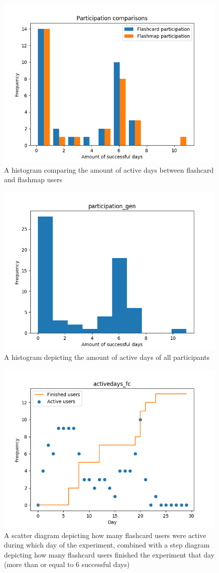 \begin{figure}[htbp]
    \centering
    \includegraphics[width=.7\textwidth]{img/participation.png}
    \caption{A histogram comparing the amount of active days between flashcard and flashmap users}
    \label{fig:participation}
\end{figure}
\begin{figure}
    \centering
    \includegraphics[width=.7\textwidth]{img/participation_gen.png}
    \caption{A histogram depicting the amount of active days of all participants}
    \label{fig:participation_gen}
\end{figure}
\begin{figure}
    \centering
    \includegraphics[width=.7\textwidth]{img/activedays_fc.png}
    \caption{A scatter diagram depicting how many flashcard users were active during which day of the experiment, combined with a step diagram depicting how many flashcard users finished the experiment that day (more than or equal to 6 successful days)}
    \label{fig:activedays_fc}
\end{figure}
